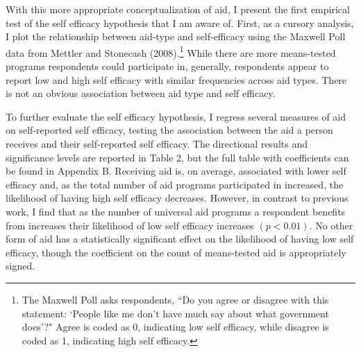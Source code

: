 \documentclass[12pt]{paper}
\begin{document}
With this more appropriate conceptualization of aid, I present the first empirical test of the self efficacy hypothesis that I am aware of. First, as a cursory analysis, I plot the relationship between aid-type and self-efficacy using the Maxwell Poll data from Mettler and Stonecash (2008).\footnote{The Maxwell Poll asks respondents, ``Do you agree or disagree with this statement: `People like me don’t have much say about what government does'?" Agree is coded as 0, indicating low self efficacy, while disagree is coded as 1, indicating high self efficacy.} While there are more means-tested programs respondents could participate in, generally, respondents appear to report low and high self efficacy with similar frequencies across aid types. There is not an obvious association between aid type and self efficacy.

To further evaluate the self efficacy hypothesis, I regress several measures of aid on self-reported self efficacy, testing the association between the aid a person receives and their self-reported self efficacy. The directional results and significance levels are reported in Table 2, but the full table with coefficients can be found in Appendix B. Receiving aid is, on average, associated with lower self efficacy and, as the total number of aid programs participated in increased, the likelihood of having high self efficacy decreases. However, in contrast to previous work, I find that as the number of universal aid programs a respondent benefits from increases their likelihood of low self efficacy increases $(p < 0.01)$. No other form of aid has a statistically significant effect on the likelihood of having low self efficacy, though the coefficient on the count of means-tested aid is appropriately signed. 
\end{document}
